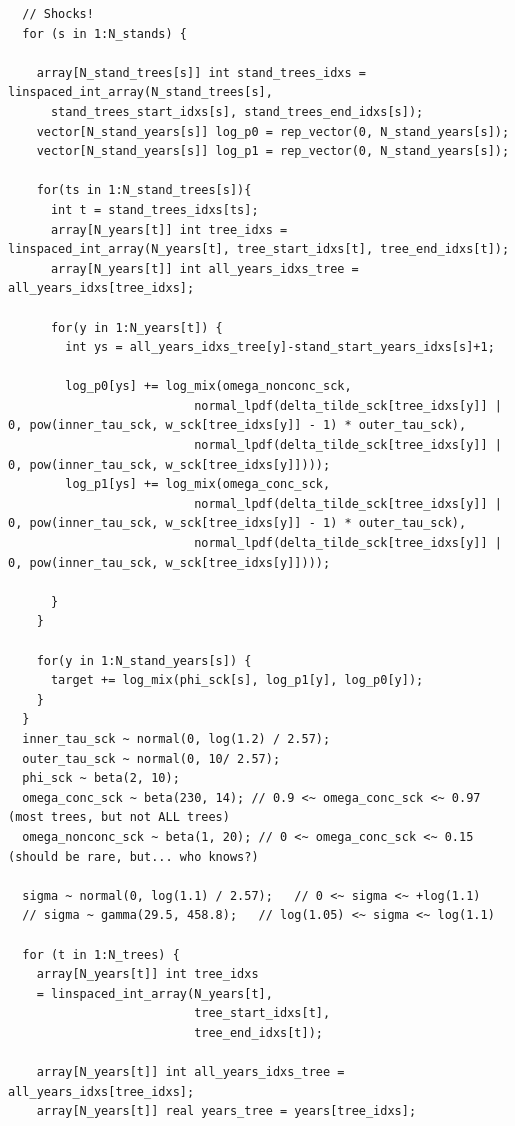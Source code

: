 \documentclass[
  letterpaper,
  DIV=11,
  numbers=noendperiod]{scrartcl}
\begin{document}
\begin{verbatim}
  // Shocks!
  for (s in 1:N_stands) {
    
    array[N_stand_trees[s]] int stand_trees_idxs = linspaced_int_array(N_stand_trees[s], 
      stand_trees_start_idxs[s], stand_trees_end_idxs[s]);
    vector[N_stand_years[s]] log_p0 = rep_vector(0, N_stand_years[s]);
    vector[N_stand_years[s]] log_p1 = rep_vector(0, N_stand_years[s]);
    
    for(ts in 1:N_stand_trees[s]){
      int t = stand_trees_idxs[ts];
      array[N_years[t]] int tree_idxs = linspaced_int_array(N_years[t], tree_start_idxs[t], tree_end_idxs[t]);
      array[N_years[t]] int all_years_idxs_tree = all_years_idxs[tree_idxs];
      
      for(y in 1:N_years[t]) {
        int ys = all_years_idxs_tree[y]-stand_start_years_idxs[s]+1;
        
        log_p0[ys] += log_mix(omega_nonconc_sck,
                          normal_lpdf(delta_tilde_sck[tree_idxs[y]] | 0, pow(inner_tau_sck, w_sck[tree_idxs[y]] - 1) * outer_tau_sck),
                          normal_lpdf(delta_tilde_sck[tree_idxs[y]] | 0, pow(inner_tau_sck, w_sck[tree_idxs[y]])));
        log_p1[ys] += log_mix(omega_conc_sck,
                          normal_lpdf(delta_tilde_sck[tree_idxs[y]] | 0, pow(inner_tau_sck, w_sck[tree_idxs[y]] - 1) * outer_tau_sck),
                          normal_lpdf(delta_tilde_sck[tree_idxs[y]] | 0, pow(inner_tau_sck, w_sck[tree_idxs[y]])));
        
      }
    }
    
    for(y in 1:N_stand_years[s]) {
      target += log_mix(phi_sck[s], log_p1[y], log_p0[y]);
    }
  }
  inner_tau_sck ~ normal(0, log(1.2) / 2.57);
  outer_tau_sck ~ normal(0, 10/ 2.57); 
  phi_sck ~ beta(2, 10); 
  omega_conc_sck ~ beta(230, 14); // 0.9 <~ omega_conc_sck <~ 0.97 (most trees, but not ALL trees)
  omega_nonconc_sck ~ beta(1, 20); // 0 <~ omega_conc_sck <~ 0.15 (should be rare, but... who knows?)
  
  sigma ~ normal(0, log(1.1) / 2.57);   // 0 <~ sigma <~ +log(1.1)
  // sigma ~ gamma(29.5, 458.8);   // log(1.05) <~ sigma <~ log(1.1)

  for (t in 1:N_trees) {
    array[N_years[t]] int tree_idxs
    = linspaced_int_array(N_years[t],
                          tree_start_idxs[t],
                          tree_end_idxs[t]);

    array[N_years[t]] int all_years_idxs_tree = all_years_idxs[tree_idxs];
    array[N_years[t]] real years_tree = years[tree_idxs];


\end{verbatim}
\end{document}
